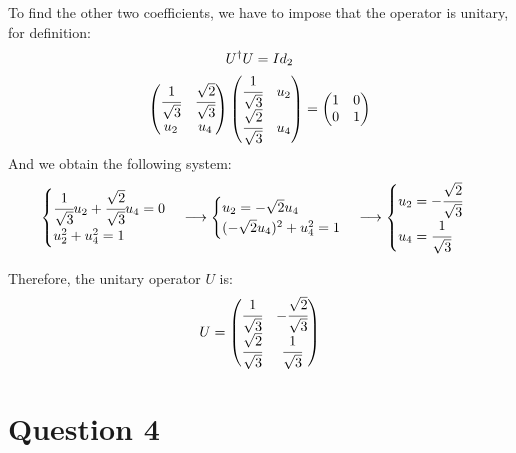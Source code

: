 \documentclass[12pt]{article}
\begin{document}
\begin{itemize}
To find the other two coefficients, we have to impose that the operator is unitary,
for definition:
\begin{gather*}
    U^\dagger U = Id_2 \\
    \begin{pmatrix}
        \cfrac{1}{\sqrt{3}} & \cfrac{\sqrt{2}}{\sqrt{3}} \\ u_2 & u_4
    \end{pmatrix}
    \begin{pmatrix}
        \cfrac{1}{\sqrt{3}} & u_2 \\ \cfrac{\sqrt{2}}{\sqrt{3}} & u_4
    \end{pmatrix}
    =
    \begin{pmatrix}
        1 & 0 \\ 0 & 1
    \end{pmatrix}
\end{gather*}
And we obtain the following system:
\begin{gather*}
    \begin{cases}
        \cfrac{1}{\sqrt{3}} u_2 + \cfrac{\sqrt{2}}{\sqrt{3}} u_4 = 0 \\
        u_2^2 + u_4^2 = 1 \\
    \end{cases}
    \longrightarrow
    \begin{cases}
        u_2 = -\sqrt{2} u_4 \\
        (-\sqrt{2} u_4)^2 + u_4^2 = 1 \\
    \end{cases}
    \longrightarrow
    \begin{cases}
        u_2 = -\cfrac{\sqrt{2}}{\sqrt{3}}\\
        u_4 = \cfrac{1}{\sqrt{3}} \\
    \end{cases}
\end{gather*}

Therefore, the unitary operator $U$ is:
\begin{gather*}
    U = 
    \begin{pmatrix}
        \cfrac{1}{\sqrt{3}} & -\cfrac{\sqrt{2}}{\sqrt{3}} \\ \cfrac{\sqrt{2}}{\sqrt{3}} & \cfrac{1}{\sqrt{3}}
    \end{pmatrix}
\end{gather*}

\end{itemize}

\section*{Question 4}
\end{document}
